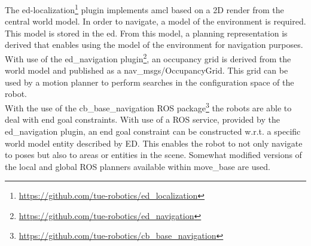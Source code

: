 The \acrshort{ed}-localization\footnote{\url{https://github.com/tue-robotics/ed_localization}} plugin implements \acrshort{amcl} based on a 2D render from the central world model. In order to navigate, a model of the environment is required. This model is stored in the \acrshort{ed}. From this model, a planning representation is derived that enables using the model of the environment for navigation purposes.
\\
With use of the ed\_navigation plugin\footnote{\url{https://github.com/tue-robotics/ed_navigation}}, an occupancy grid is derived from the world model and published as a nav\_msgs/OccupancyGrid. This grid can be used by a motion planner to perform searches in the configuration space of the robot.
\\
With the use of the cb\_base\_navigation ROS package\footnote{\url{https://github.com/tue-robotics/cb_base_navigation}} the robots are able to deal with end goal constraints. With use of a ROS service, provided by the ed\_navigation plugin, an end goal constraint can be constructed w.r.t. a specific world model entity described by ED. This enables the robot to not only navigate to poses but also to areas or entities in the scene.
Somewhat modified versions of the local and global ROS planners available within move\_base are used.
